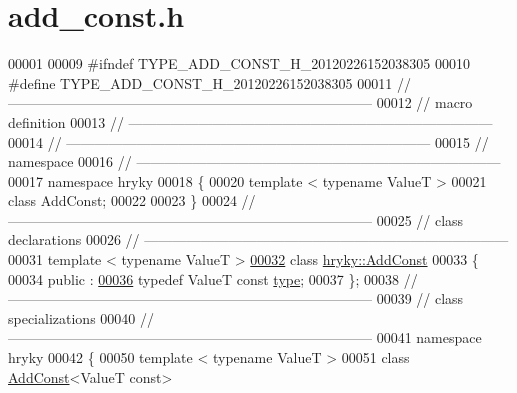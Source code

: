 \hypertarget{add__const_8h_source}{\section{add\-\_\-const.\-h}
}

\begin{DoxyCode}
00001 
00009 \textcolor{preprocessor}{#ifndef TYPE\_ADD\_CONST\_H\_20120226152038305}
00010 \textcolor{preprocessor}{}\textcolor{preprocessor}{#define TYPE\_ADD\_CONST\_H\_20120226152038305}
00011 \textcolor{preprocessor}{}\textcolor{comment}{//
      ------------------------------------------------------------------------------}
00012 \textcolor{comment}{// macro definition}
00013 \textcolor{comment}{//
      ------------------------------------------------------------------------------}
00014 \textcolor{comment}{//
      ------------------------------------------------------------------------------}
00015 \textcolor{comment}{// namespace}
00016 \textcolor{comment}{//
      ------------------------------------------------------------------------------}
00017 \textcolor{keyword}{namespace }hryky
00018 \{
00020     \textcolor{keyword}{template} < \textcolor{keyword}{typename} ValueT >
00021     \textcolor{keyword}{class }AddConst;
00022 
00023 \}
00024 \textcolor{comment}{//
      ------------------------------------------------------------------------------}
00025 \textcolor{comment}{// class declarations}
00026 \textcolor{comment}{//
      ------------------------------------------------------------------------------}
00031 \textcolor{comment}{}\textcolor{keyword}{template} < \textcolor{keyword}{typename} ValueT >
\hypertarget{add__const_8h_source_l00032}{}\hyperlink{classhryky_1_1_add_const}{00032} \textcolor{keyword}{class }\hyperlink{classhryky_1_1_add_const}{hryky::AddConst}
00033 \{
00034 \textcolor{keyword}{public} :
\hypertarget{add__const_8h_source_l00036}{}\hyperlink{classhryky_1_1_add_const_adb29046fcfdac9d716cb5cb3c28d42ac}{00036}     \textcolor{keyword}{typedef} ValueT \textcolor{keyword}{const}    \hyperlink{classhryky_1_1_add_const_adb29046fcfdac9d716cb5cb3c28d42ac}{type};
00037 \};
00038 \textcolor{comment}{//
      ------------------------------------------------------------------------------}
00039 \textcolor{comment}{// class specializations}
00040 \textcolor{comment}{//
      ------------------------------------------------------------------------------}
00041 \textcolor{keyword}{namespace }hryky
00042 \{
00050 \textcolor{keyword}{template} < \textcolor{keyword}{typename} ValueT >
00051 \textcolor{keyword}{class }\hyperlink{classhryky_1_1_add_const}{AddConst}<ValueT const>

\end{DoxyCode}
